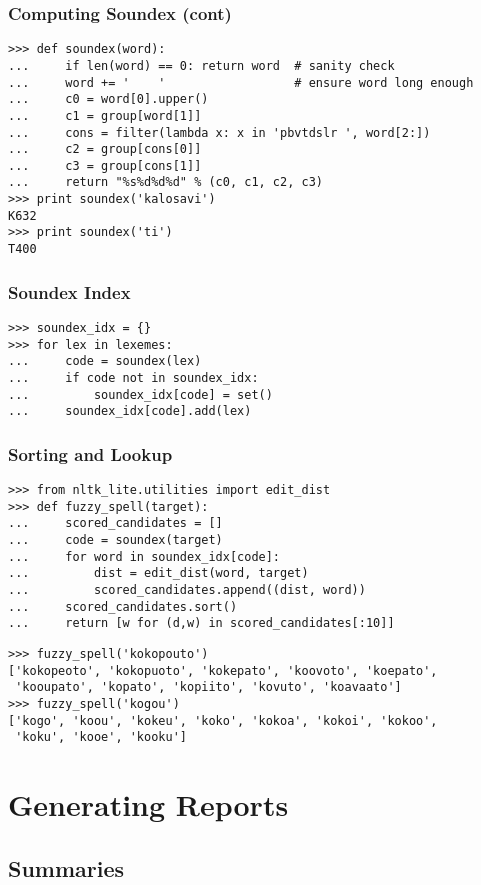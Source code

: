 \documentclass[handout]{beamer}
\begin{document}
\begin{frame}[fragile]
\frametitle{Computing Soundex (cont)}
\scriptsize

\begin{verbatim}
>>> def soundex(word):
...     if len(word) == 0: return word  # sanity check
...     word += '    '                  # ensure word long enough
...     c0 = word[0].upper()
...     c1 = group[word[1]]
...     cons = filter(lambda x: x in 'pbvtdslr ', word[2:])
...     c2 = group[cons[0]]
...     c3 = group[cons[1]]
...     return "%s%d%d%d" % (c0, c1, c2, c3)
>>> print soundex('kalosavi')
K632
>>> print soundex('ti')
T400
\end{verbatim}
\end{frame}

\begin{frame}[fragile]
\frametitle{Soundex Index}
\begin{verbatim}
>>> soundex_idx = {}
>>> for lex in lexemes:
...     code = soundex(lex)
...     if code not in soundex_idx:
...         soundex_idx[code] = set()
...     soundex_idx[code].add(lex)
\end{verbatim}
\end{frame}

\begin{frame}[fragile]
\frametitle{Sorting and Lookup}
\scriptsize
\begin{verbatim}
>>> from nltk_lite.utilities import edit_dist
>>> def fuzzy_spell(target):
...     scored_candidates = []
...     code = soundex(target)
...     for word in soundex_idx[code]:
...         dist = edit_dist(word, target)
...         scored_candidates.append((dist, word))
...     scored_candidates.sort()
...     return [w for (d,w) in scored_candidates[:10]]
\end{verbatim}

\begin{verbatim}
>>> fuzzy_spell('kokopouto')
['kokopeoto', 'kokopuoto', 'kokepato', 'koovoto', 'koepato',
 'kooupato', 'kopato', 'kopiito', 'kovuto', 'koavaato']
>>> fuzzy_spell('kogou')
['kogo', 'koou', 'kokeu', 'koko', 'kokoa', 'kokoi', 'kokoo',
 'koku', 'kooe', 'kooku']
\end{verbatim}
\end{frame}

\section{Generating Reports}

\subsection{Summaries}
\end{document}
